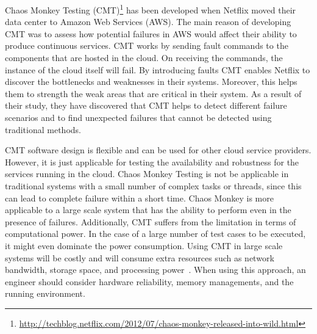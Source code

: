 Chaos Monkey Testing (CMT)\footnote{\url{http://techblog.netflix.com/2012/07/chaos-monkey-released-into-wild.html}} %
has been developed when Netflix moved their data center to Amazon Web Services (AWS). The main reason of developing CMT was to assess how potential failures in AWS would affect their ability to produce continuous services. 
CMT works by sending fault commands to the components that are hosted in the cloud. On receiving the commands, the instance of the cloud itself will fail. By introducing faults CMT enables Netflix to discover the bottlenecks and weaknesses in their systems. Moreover, this helps them to strength the weak areas that are critical in their system. As a result of their study, they have discovered that CMT helps to detect different failure scenarios and to find %
unexpected failures that cannot be detected using traditional methods. %

CMT software design is flexible and can be used for other cloud service providers. However, it is just applicable for testing the availability and robustness for the services running in the cloud. Chaos Monkey Testing is not be applicable in traditional systems with a small number of complex tasks or threads, since this can lead to complete failure within a short time. Chaos Monkey is more applicable to a large scale system that has the ability to perform even in the presence of failures. %
Additionally, CMT suffers from the limitation in terms of computational power. In the case of a large number of test cases to be executed, it might even dominate the power consumption. Using CMT in large scale systems will be costly and will consume extra resources such as network bandwidth, storage space, and processing power~\cite{gunawi2011failure}. When using this approach, an engineer should consider hardware reliability, memory managements, and the running environment. 
 
